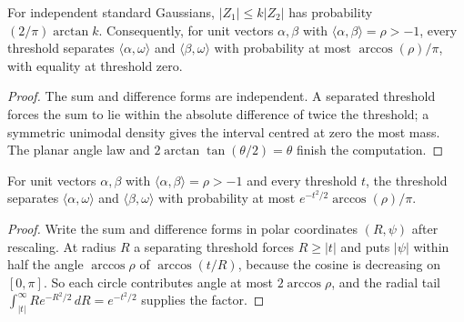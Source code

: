 \begin{lemma}
  \label{lem:lowerbounds-algebraic-gaussian-sheppard}
  \leanok
  For independent standard Gaussians, $|Z_1|\le k|Z_2|$ has probability
  $(2/\pi)\arctan k$. Consequently, for unit vectors $\alpha,\beta$ with
  $\langle\alpha,\beta\rangle=\rho>-1$, every threshold separates
  $\langle\alpha,\omega\rangle$ and $\langle\beta,\omega\rangle$ with probability at most
  $\arccos(\rho)/\pi$, with equality at threshold zero.
\end{lemma}
\begin{proof}
  \leanok
  The sum and difference forms are independent. A separated threshold forces the sum to
  lie within the absolute difference of twice the threshold; a symmetric unimodal density
  gives the interval centred at zero the most mass. The planar angle law and
  $2\arctan\tan(\theta/2)=\theta$ finish the computation.
\end{proof}

\begin{lemma}
  \label{lem:lowerbounds-algebraic-gaussian-decay}
  \leanok
  For unit vectors $\alpha,\beta$ with $\langle\alpha,\beta\rangle=\rho>-1$ and every
  threshold $t$, the threshold separates $\langle\alpha,\omega\rangle$ and
  $\langle\beta,\omega\rangle$ with probability at most
  $e^{-t^2/2}\arccos(\rho)/\pi$.
\end{lemma}
\begin{proof}
  \leanok
  Write the sum and difference forms in polar coordinates $(R,\psi)$ after rescaling. At
  radius $R$ a separating threshold forces $R\ge|t|$ and puts $|\psi|$ within half the angle
  $\arccos\rho$ of $\arccos(t/R)$, because the cosine is decreasing on $[0,\pi]$. So each
  circle contributes angle at most $2\arccos\rho$, and the radial tail
  $\int_{|t|}^\infty Re^{-R^2/2}\,dR=e^{-t^2/2}$ supplies the factor.
\end{proof}

